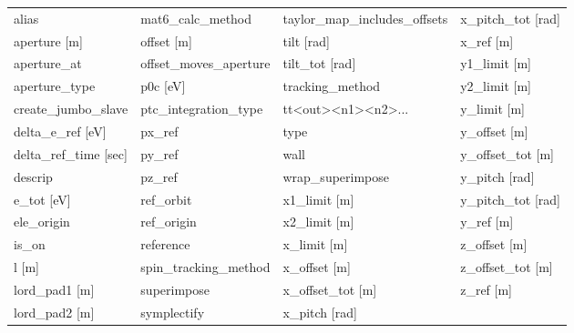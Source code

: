  \begin{tabular}{llll} \toprule
alias                            & mat6_calc_method                 & taylor_map_includes_offsets      & x_pitch_tot [rad]                \\
aperture [m]                     & offset [m]                       & tilt [rad]                       & x_ref [m]                        \\
aperture_at                      & offset_moves_aperture            & tilt_tot [rad]                   & y1_limit [m]                     \\
aperture_type                    & p0c [eV]                         & tracking_method                  & y2_limit [m]                     \\
create_jumbo_slave               & ptc_integration_type             & tt<out><n1><n2>...               & y_limit [m]                      \\
delta_e_ref [eV]                 & px_ref                           & type                             & y_offset [m]                     \\
delta_ref_time [sec]             & py_ref                           & wall                             & y_offset_tot [m]                 \\
descrip                          & pz_ref                           & wrap_superimpose                 & y_pitch [rad]                    \\
e_tot [eV]                       & ref_orbit                        & x1_limit [m]                     & y_pitch_tot [rad]                \\
ele_origin                       & ref_origin                       & x2_limit [m]                     & y_ref [m]                        \\
is_on                            & reference                        & x_limit [m]                      & z_offset [m]                     \\
l [m]                            & spin_tracking_method             & x_offset [m]                     & z_offset_tot [m]                 \\
lord_pad1 [m]                    & superimpose                      & x_offset_tot [m]                 & z_ref [m]                        \\
lord_pad2 [m]                    & symplectify                      & x_pitch [rad]                    &                                  \\
 \bottomrule
 \end{tabular}
 \vfill
 
